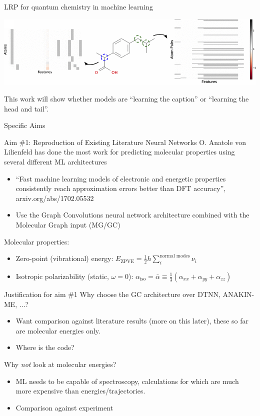 \documentclass[compress]{beamer}
\begin{document}
\begin{frame}{LRP for quantum chemistry in machine learning}
  \begin{center}
    \includegraphics[width=1.00\textwidth]{./figures/bad_featurization.png}
  \end{center}
  This work will show whether models are ``learning the caption'' or ``learning the head and tail''.
\end{frame}

\begin{frame}{Specific Aims}
\end{frame}

\begin{frame}{Aim \#1: Reproduction of Existing Literature Neural Networks}
  O. Anatole von Lilienfeld has done the most work for predicting molecular properties using several different ML architectures
  \begin{itemize}
  \item ``Fast machine learning models of electronic and energetic properties consistently reach approximation errors better than DFT accuracy'', arxiv.org/abs/1702.05532
  \item Use the Graph Convolutions neural network architecture combined with the Molecular Graph input (MG/GC)
  \end{itemize}
  Molecular properties:
  \begin{itemize}
  \item Zero-point (vibrational) energy: \(E_{\text{ZPVE}} = \frac{1}{2} h \sum_{i}^{\text{normal modes}} \nu_{i}\)
  \item Isotropic polarizability (static, \(\omega = 0\)): \(\alpha_{\text{iso}} = \bar{\alpha} \equiv \frac{1}{3} (\alpha_{xx} + \alpha_{yy} + \alpha_{zz})\)
  \end{itemize}
\end{frame}

\begin{frame}{Justification for aim \#1}
  Why choose the GC architecture over DTNN, ANAKIN-ME, ...?
  \begin{itemize}
  \item Want comparison against literature results (more on this later), these so far are molecular energies only.
  \item Where is the code?
  \end{itemize}
  Why \emph{not} look at molecular energies?
  \begin{itemize}
  \item ML needs to be capable of spectroscopy, calculations for which are much more expensive than energies/trajectories.
  \item Comparison against experiment
  \end{itemize}
\end{frame}
\end{document}
